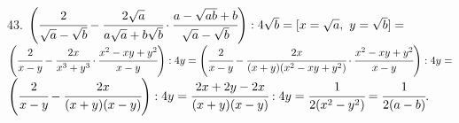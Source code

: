 43. $\left(\cfrac{2}{\sqrt{a}-\sqrt{b}}-\cfrac{2\sqrt{a}}{a\sqrt{a}+b\sqrt{b}}\cdot\cfrac{a-\sqrt{ab}+b}{\sqrt{a}-\sqrt{b}}\right):4\sqrt{b}=[x=\sqrt{a},\ y=\sqrt{b}]=$\\$\left(\cfrac{2}{x-y}-\cfrac{2x}{x^3+y^3}\cdot\cfrac{x^2-xy+y^2}{x-y}\right):4y=
\left(\cfrac{2}{x-y}-\cfrac{2x}{(x+y)(x^2-xy+y^2)}\cdot\cfrac{x^2-xy+y^2}{x-y}\right):4y=$\\$
\left(\cfrac{2}{x-y}-\cfrac{2x}{(x+y)(x-y)}\right):4y=
\cfrac{2x+2y-2x}{(x+y)(x-y)}:4y=\cfrac{1}{2(x^2-y^2)}=\cfrac{1}{2(a-b)}.$\\
